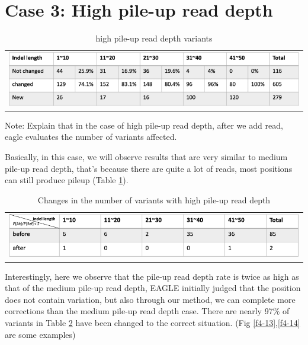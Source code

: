 \section{Case 3: High pile-up read depth}
\begin{table}[h]
    \centering
    \caption[high pile-up read depth variants]{high pile-up read depth variants}
     \vspace{-0.5cm}
    \begin{tabular}{c}
        \includegraphics[width=1\textwidth]{body/image/t4-6.png}
    \end{tabular}
    \label{t4-6}
    {Note: Explain that in the case of high pile-up read depth, after we add read, eagle evaluates the number of variants affected.}
\end{table}


Basically, in this case, we will observe results that are very similar to medium pile-up read depth, that's because there are quite a lot of reads, most positions can still produce pileup (Table \ref{t4-6}).

\vspace{1cm}
\begin{table}[h]
    \centering
    \caption[Changes in the number of variants with high pile-up read depth]{Changes in the number of variants with high pile-up read depth}
    \vspace{-0.5cm}
    \begin{tabular}{c}
        \includegraphics[width=1\textwidth]{body/image/t4-7.png}
    \end{tabular}
    \label{t4-7}
\end{table}

Interestingly, here we observe that the pile-up read depth rate is twice as high as that of the medium pile-up read depth, EAGLE initially judged that the position does not contain variation, but also through our method, we can complete more corrections than the medium pile-up read depth case. There are nearly 97\% of variants in Table \ref{t4-7} have been changed to the correct situation. (Fig \ref{f4-13},\ref{f4-14} are some examples)

